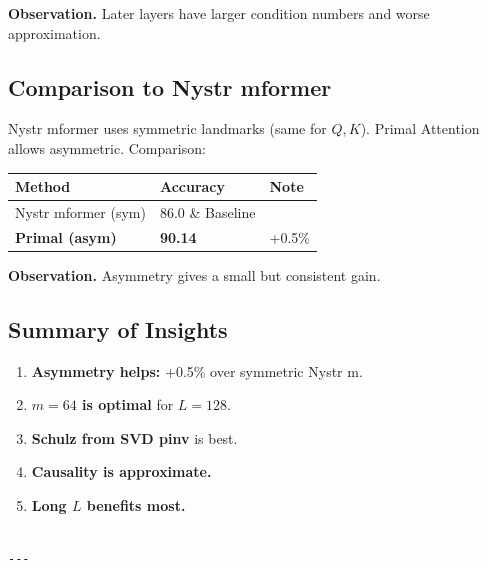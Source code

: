 \textbf{Observation.} Later layers have larger condition numbers and worse 
approximation.

\subsection{Comparison to Nystr mformer}

Nystr mformer uses symmetric landmarks (same for $Q, K$). Primal Attention 
allows asymmetric. Comparison:

\begin{table}[H]
\centering
\small
\begin{tabular}{lll}
\toprule
\textbf{Method} & \textbf{Accuracy} & \textbf{Note} \\
\midrule
Nystr mformer (sym) & 86.0 \& Baseline \\
\textbf{Primal (asym)} & \textbf{90.14} & +0.5\% \\
\bottomrule
\end{tabular}
\end{table}

\textbf{Observation.} Asymmetry gives a small but consistent gain.

\subsection{Summary of Insights}

\begin{enumerate}
\item \textbf{Asymmetry helps:} +0.5\% over symmetric Nystr m.
\item \textbf{$m = 64$ is optimal} for $L = 128$.
\item \textbf{Schulz from SVD pinv} is best.
\item \textbf{Causality is approximate.}
\item \textbf{Long $L$ benefits most.}
\end{enumerate}
\begin{lstlisting}

---
\end{lstlisting}
